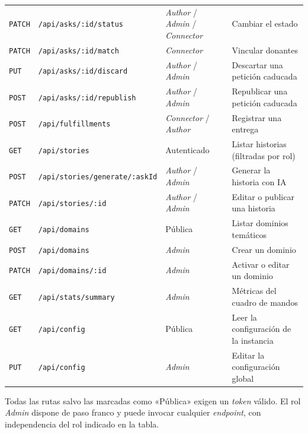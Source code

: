 \documentclass[11pt,oneside,spanish,listoffigures,listoftables]{tfgetsinf}
\begin{document}
\begin{table}[ht]
\begin{tabularx}{\textwidth}{%
  >{\raggedright\arraybackslash}p{1.1cm}%
  >{\raggedright\arraybackslash}p{4.0cm}%
  >{\raggedright\arraybackslash}p{2.9cm}%
  >{\raggedright\arraybackslash}X}
\texttt{PATCH}  & \texttt{/api/asks/:id/status}    & \textit{Author} / \textit{Admin} / \textit{Connector}  & Cambiar el estado \\
\texttt{PATCH}  & \texttt{/api/asks/:id/match}     & \textit{Connector}                                     & Vincular donantes \\
\texttt{PUT}    & \texttt{/api/asks/:id/discard}   & \textit{Author} / \textit{Admin}                       & Descartar una petición caducada \\
\texttt{POST}   & \texttt{/api/asks/:id/republish} & \textit{Author} / \textit{Admin}                       & Republicar una petición caducada \\
\midrule
\texttt{POST}   & \texttt{/api/fulfillments}       & \textit{Connector} / \textit{Author}                   & Registrar una entrega \\
\midrule
\texttt{GET}    & \texttt{/api/stories}                 & Autenticado                                       & Listar historias (filtradas por rol) \\
\texttt{POST}   & \texttt{/api/stories/}\newline\texttt{generate/:askId} & \textit{Author} / \textit{Admin}                  & Generar la historia con IA \\
\texttt{PATCH}  & \texttt{/api/stories/:id}             & \textit{Author} / \textit{Admin}                  & Editar o publicar una historia \\
\midrule
\texttt{GET}    & \texttt{/api/domains}            & Pública                                                & Listar dominios temáticos \\
\texttt{POST}   & \texttt{/api/domains}            & \textit{Admin}                                         & Crear un dominio \\
\texttt{PATCH}  & \texttt{/api/domains/:id}        & \textit{Admin}                                         & Activar o editar un dominio \\
\midrule
\texttt{GET}    & \texttt{/api/stats/summary}      & \textit{Admin}                                         & Métricas del cuadro de mandos \\
\texttt{GET}    & \texttt{/api/config}             & Pública                                                & Leer la configuración de la instancia \\
\texttt{PUT}    & \texttt{/api/config}             & \textit{Admin}                                         & Editar la configuración global \\
\bottomrule
\end{tabularx}

\vspace{0.4em}
{\footnotesize Todas las rutas salvo las marcadas como «Pública» exigen un \textit{token} válido. El rol \textit{Admin} dispone de paso franco y puede invocar cualquier \textit{endpoint}, con independencia del rol indicado en la tabla.}
\end{table}
\end{document}
